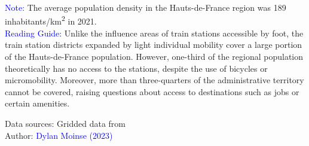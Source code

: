 \begin{table}[h!]
\begin{flushleft}
{        \textcolor{blue}{Note:} The average population density in the Hauts-de-France region was 189 inhabitants/km\textsuperscript{2} in 2021.
        \\
        \textcolor{blue}{Reading Guide:} Unlike the influence areas of train stations accessible by foot, the train station districts expanded by light individual mobility cover a large portion of the Hauts-de-France population. However, one-third of the regional population theoretically has no access to the stations, despite the use of bicycles or micromobility. Moreover, more than three-quarters of the administrative territory cannot be covered, raising questions about access to destinations such as jobs or certain amenities.
        }\end{flushleft}
        \begin{flushright}\scriptsize
        Data sources: Gridded data from \textcolor{blue}{\textcite{insee_grille_2021}}
        \\
        Author: \textcolor{blue}{Dylan Moinse (2023)}
        \end{flushright}
        \end{table}